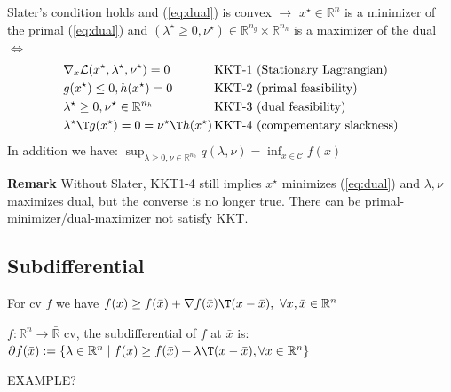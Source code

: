 \begin{theorem}
	Slater's condition holds
	and (\ref{eq:dual}) is convex
	$\rightarrow$
	$x^\star \in \mathbb{R}^{n}$ is a minimizer of the primal (\ref{eq:dual})
	and $(\lambda^\star \ge 0,\nu^\star) \in \mathbb{R}^{n_g}\times\mathbb{R}^{n_h}$ is a maximizer of the dual
	$\Leftrightarrow$
	$$\begin{aligned}
			              & \nabla_x\mathcal{L}(x^\star,\lambda^\star,\nu^\star)=0
			              & \text{KKT-1 }
			              & \text{(Stationary Lagrangian)}
			\\
			              & g(x^\star)\le0, h(x^\star)=0
			              & \text{KKT-2 }
			              & \text{(primal feasibility)}
			\\
			              & \lambda^\star\ge0, \nu^\star \in \mathbb{R}^{n_h}
			              & \text{KKT-3 }
			              & \text{(dual feasibility)}
			\\
			              & {\lambda^\star}\T g(x^\star)=0={\nu^\star}\T h(x^\star)
			\hspace{-3mm} &
			\text{KKT-4 }
			              & \text{(compementary slackness)}
			\\
		\end{aligned}$$
	In addition we have:
	$\sup_{\lambda\ge0,\nu\in\mathbb{R}^{n_h}}q(\lambda,\nu)=\inf_{x\in\mathcal{C}}f(x)$
\end{theorem}

\textbf{Remark} Without Slater,
KKT1-4 still implies $x^\star$ minimizes (\ref{eq:dual})
and $\lambda,\nu$ maximizes dual,
but the converse is no longer true.
There can be primal-minimizer/dual-maximizer not satisfy KKT.

\subsection{Subdifferential}

For cv $f$ we have
$f(x)\ge f(\bar{x})+\nabla f(\bar{x})\T(x-\bar{x}),\ \forall x,\bar{x}\in \mathbb{R}^{n}$

\begin{definition}
	$f: \mathbb{R}^{n} \rightarrow \bar{\mathbb{R}}$ cv,
	the subdifferential of $f$ at $\bar{x}$ is:
	$\partial f(\bar{x}):=
		\{\lambda \in \mathbb{R}^{n} \mid
		f(x)\ge f(\bar{x})+\lambda\T(x-\bar{x}),
		\forall x \in \mathbb{R}^{n}
		\}$
	\label{def:subdifferential}
\end{definition}

EXAMPLE?


